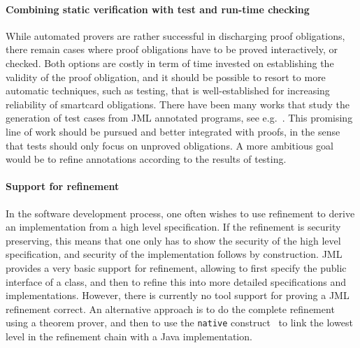 \paragraph{Combining static verification with test and run-time checking}
While automated provers are rather successful in discharging proof
obligations, there remain cases where proof obligations have to be
proved interactively, or checked. Both options are costly in term of
time invested on establishing the validity of the proof obligation,
and it should be possible to resort to more automatic techniques, such
as testing, that is well-established for increasing reliability of
smartcard obligations. There have been many works that study the
generation of test cases from JML annotated programs, see
e.g.~\cite{jll04:ase}. This promising line of work should be pursued
and better integrated with proofs, in the sense that tests should only
focus on unproved obligations. A more ambitious goal would be to refine
annotations according to the results of testing.


\paragraph{Support for refinement}

In the software development process, one often wishes to use
refinement to derive an implementation from a high level
specification. If the refinement is security preserving, this means
that one only has to show the security of the high level
specification, and security of the implementation follows by
construction. JML provides a very basic support for refinement,
allowing to first specify the public interface of a class, and then to
refine this into more detailed specifications and
implementations. However, there is currently no tool support for
proving a JML refinement correct. An alternative approach is to do the
complete refinement using a theorem prover, and then to use the
\texttt{native} construct~\cite{Charles06} to link the lowest level in
the refinement chain with a Java implementation.
